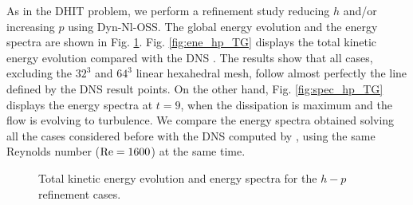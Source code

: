 As in the DHIT problem, we perform a refinement study reducing $h$ and/or increasing $p$ using  Dyn-Nl-OSS. 
The global energy evolution and the energy spectra are shown in Fig. \ref{fig:ene_spec_hp_TG}. Fig. \ref{fig:ene_hp_TG} displays the total kinetic energy evolution compared with the DNS \cite{brachet_small-scale_1983}. The results show that all cases, excluding the $32^3$ and $64^3$ linear hexahedral mesh, follow almost perfectly the line defined by the DNS result points. On the other hand, Fig. \ref{fig:spec_hp_TG} displays the energy spectra at $t=9$, when the dissipation is maximum and the flow is evolving to turbulence. We compare the energy spectra obtained solving all the cases considered before with the DNS computed by \cite{gassner_accuracy_????}, using the same Reynolds number (${\rm Re}=1600$) at the same time. 
\begin{figure}[h!]
	\centering
	\caption{Total kinetic energy evolution and energy spectra for the $h-p$ refinement cases.}
	\label{fig:ene_spec_hp_TG}
\end{figure}


